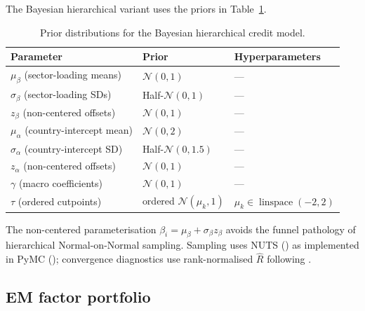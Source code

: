The Bayesian hierarchical variant uses the priors in Table~\ref{tab:bayes_priors}.

\begin{table}[h]
  \centering\small
  \begin{threeparttable}
  \caption{Prior distributions for the Bayesian hierarchical credit model.}
  \label{tab:bayes_priors}
  \begin{tabular}{lll}
    \toprule
    Parameter & Prior & Hyperparameters \\
    \midrule
    $\mu_\beta$ (sector-loading means) & $\mathcal{N}(0, 1)$ & --- \\
    $\sigma_\beta$ (sector-loading SDs) & Half-$\mathcal{N}(0, 1)$ & --- \\
    $z_\beta$ (non-centered offsets) & $\mathcal{N}(0, 1)$ & --- \\
    $\mu_\alpha$ (country-intercept mean) & $\mathcal{N}(0, 2)$ & --- \\
    $\sigma_\alpha$ (country-intercept SD) & Half-$\mathcal{N}(0, 1.5)$ & --- \\
    $z_\alpha$ (non-centered offsets) & $\mathcal{N}(0, 1)$ & --- \\
    $\gamma$ (macro coefficients) & $\mathcal{N}(0, 1)$ & --- \\
    $\tau$ (ordered cutpoints) & ordered $\mathcal{N}(\mu_k, 1)$ & $\mu_k \in \operatorname{linspace}(-2, 2)$ \\
    \bottomrule
  \end{tabular}
  \end{threeparttable}
\end{table}

The non-centered parameterisation $\beta_i = \mu_\beta + \sigma_\beta z_\beta$ avoids the funnel pathology of hierarchical Normal-on-Normal sampling. Sampling uses NUTS (\textcite{hoffmangelman2014nuts}) as implemented in PyMC (\textcite{salvatieretal2016pymc}); convergence diagnostics use rank-normalised $\widehat{R}$ following \textcite{vehtari2021rank}.

\subsection{EM factor portfolio}\label{sec:portfolio_method}

